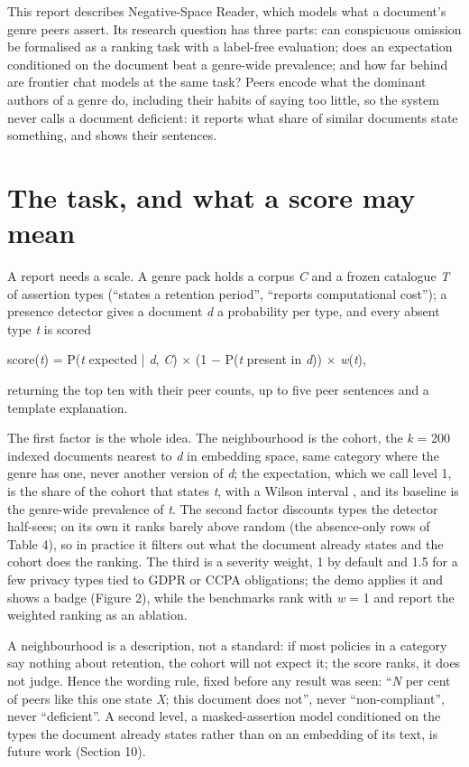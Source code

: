 \documentclass[11pt,a4paper]{article}
\begin{document}
This report describes Negative-Space Reader, which models what a document's genre peers assert. Its research question has three parts: can conspicuous omission be formalised as a ranking task with a label-free evaluation; does an expectation conditioned on the document beat a genre-wide prevalence; and how far behind are frontier chat models at the same task? Peers encode what the dominant authors of a genre do, including their habits of saying too little, so the system never calls a document deficient: it reports what share of similar documents state something, and shows their sentences.

\section{The task, and what a score may mean}

A report needs a scale. A genre pack holds a corpus \emph{C} and a frozen catalogue \emph{T} of assertion types (``states a retention period'', ``reports computational cost''); a presence detector gives a document \emph{d} a probability per type, and every absent type \emph{t} is scored

\begin{center}
score(\emph{t}) = P(\emph{t} expected | \emph{d}, \emph{C}) $\times$ (1 $-$ P(\emph{t} present in \emph{d})) $\times$ \emph{w}(\emph{t}),
\end{center}

returning the top ten with their peer counts, up to five peer sentences and a template explanation.

The first factor is the whole idea. The neighbourhood is the cohort, the \emph{k} = 200 indexed documents nearest to \emph{d} in embedding space, same category where the genre has one, never another version of \emph{d}; the expectation, which we call level 1, is the share of the cohort that states \emph{t}, with a Wilson interval \cite{r4}, and its baseline is the genre-wide prevalence of \emph{t}. The second factor discounts types the detector half-sees; on its own it ranks barely above random (the absence-only rows of Table 4), so in practice it filters out what the document already states and the cohort does the ranking. The third is a severity weight, 1 by default and 1.5 for a few privacy types tied to GDPR or CCPA obligations; the demo applies it and shows a badge (Figure 2), while the benchmarks rank with \emph{w} = 1 and report the weighted ranking as an ablation.

A neighbourhood is a description, not a standard: if most policies in a category say nothing about retention, the cohort will not expect it; the score ranks, it does not judge. Hence the wording rule, fixed before any result was seen: ``\emph{N} per cent of peers like this one state \emph{X}; this document does not'', never ``non-compliant'', never ``deficient''. A second level, a masked-assertion model conditioned on the types the document already states rather than on an embedding of its text, is future work (Section 10).
\end{document}
